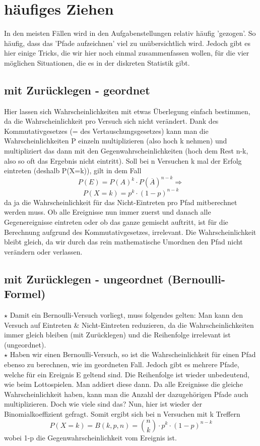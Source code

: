\section{häufiges Ziehen}
	In den meisten Fällen wird in den Aufgabenstellungen relativ häufig 'gezogen'.
	So häufig, dass das 'Pfade aufzeichnen' viel zu unübersichtlich wird. Jedoch
	gibt es hier einige Tricks, die wir hier noch einmal zusammenfassen wollen, für
	die vier möglichen Situationen, die es in der diskreten Statistik gibt.

	\subsection{mit Zurücklegen - geordnet}
		Hier lassen sich Wahrscheinlichkeiten mit etwas Überlegung einfach bestimmen,
		da die Wahrscheinlichkeit pro Versuch sich nicht verändert. Dank des
		Kommutativgesetzes (= des Vertauschungsgesetzes) kann man die
		Wahrscheinlichkeiten P einzeln multiplizieren (also hoch k nehmen) und
		multipliziert das dann mit den Gegenwahrscheinlichkeiten (hoch dem Rest n-k,
		also so oft das Ergebnis nicht eintritt). Soll bei n Versuchen k mal der
		Erfolg eintreten (deshalb P(X=k)), gilt in dem Fall
		\[P(E)=P(A)^k\cdot P(\overline{A})^{n-k} \Rightarrow\] \[P(X=k)=p^k\cdot
		(1-p)^{n-k}\]
		da ja die Wahrscheinlichkeit für das Nicht-Eintreten pro Pfad mitberechnet
		werden muss. Ob alle Ereignisse nun immer zuerst und danach alle
		Gegenereignisse eintreten oder ob das ganze gemischt auftritt, ist für die
		Berechnung aufgrund des Kommutativgesetzes, irrelevant. Die Wahrscheinlichkeit
		bleibt gleich, da wir durch das rein mathematische Umordnen den Pfad nicht
		verändern oder verlassen.

	\subsection{mit Zurücklegen - ungeordnet (Bernoulli-Formel)}
		\(\star\) Damit ein Bernoulli-Versuch vorliegt, muss folgendes gelten: Man
		kann den Versuch auf Eintreten \& Nicht-Eintreten reduzieren, da die
		Wahrscheinlichkeiten immer gleich bleiben (mit Zurücklegen) und die
		Reihenfolge irrelevant ist (ungeordnet).\\
		
		\(\star\) Haben wir einen Bernoulli-Versuch, so ist die Wahrscheinlichkeit für
		einen Pfad ebenso zu berechnen, wie im geordneten Fall. Jedoch gibt es mehrere
		Pfade, welche für ein Ereignis E geltend sind. Die Reihenfolge ist wieder
		unbedeutend, wie beim Lottospielen. Man addiert diese dann. Da alle Ereignisse
		die gleiche Wahrscheinlichkeit haben, kann man die Anzahl der dazugehörigen
		Pfade auch multiplizieren. Doch wie viele sind das? Nun, hier ist wieder der
		Binomialkoeffizient gefragt. Somit ergibt sich bei n Versuchen mit k Treffern
		\[P(X=k)=B(k,p,n)=\binom{n}{k}\cdot p^k\cdot (1-p)^{n-k}\] wobei 1-p die
		Gegenwahrscheinlichkeit vom Ereignis ist.
